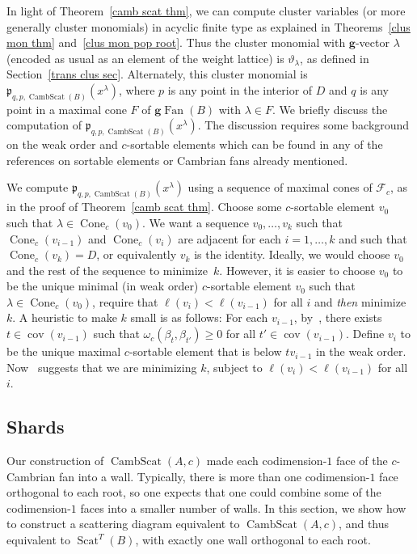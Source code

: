 \documentclass[ALCO,ThmDefs,Unicode,epreuves]{cedram}
\DeclareMathOperator{\cov}{cov}
\DeclareMathOperator{\Cone}{Cone}
\DeclareMathOperator{\Scat}{Scat}
\DeclareMathOperator{\Fan}{Fan}
\DeclareMathOperator{\CambScat}{CambScat}
\newcommand{\gFan}{\g\!\Fan}
\newcommand{\thet}{\vartheta}
\newcommand{\F}{{\mathcal F}}
\newcommand{\p}{{\mathfrak p}}
\newcommand{\g}{\mathbf{g}}
\begin{document}
\begin{rema}\label{comput}
In light of Theorem~\ref{camb scat thm}, we can compute cluster variables (or more generally cluster monomials) in acyclic finite type as explained in Theorems~\ref{clus mon thm} and~\ref{clus mon pop root}.
Thus the cluster monomial with $\g$-vector $\lambda$ (encoded as usual as an element of the weight lattice) is $\thet_\lambda$, as defined in Section~\ref{trans clus sec}.
Alternately, this cluster monomial is $\p_{q,p,\CambScat(B)}(x^\lambda)$, where $p$ is any point in the interior of $D$ and $q$ is any point in a maximal cone $F$ of $\gFan(B)$ with $\lambda\in F$.
We briefly discuss the computation of $\p_{q,p,\CambScat(B)}(x^\lambda)$.
The discussion requires some background on the weak order and $c$-sortable elements which can be found in any of the references on sortable elements or Cambrian fans already mentioned.

We compute $\p_{q,p,\CambScat(B)}(x^\lambda)$ using a sequence of maximal cones of $\F_c$, as in the proof of Theorem~\ref{camb scat thm}.
Choose some $c$-sortable element $v_0$ such that $\lambda\in\Cone_c(v_0)$.
We want a sequence $v_0,\ldots,v_k$ such that $\Cone_c(v_{i-1})$ and $\Cone_c(v_i)$ are adjacent for each $i=1,\ldots,k$ and such that $\Cone_c(v_k)=D$, or equivalently $v_k$ is the identity.
Ideally, we would choose $v_0$ and the rest of the sequence to minimize~$k$.
However, it is easier to choose $v_0$ to be the unique minimal (in weak order) $c$-sortable element $v_0$ such that $\lambda\in\Cone_c(v_0)$, require that $\ell(v_i)<\ell(v_{i-1})$ for all $i$ and \emph{then} minimize $k$.
A heuristic to make $k$ small is as follows:
For each $v_{i-1}$, by~\cite[Proposition~3.11]{typefree}, there exists $t\in\cov(v_{i-1})$ such that $\omega_c(\beta_t,\beta_{t'})\ge0$ for all $t'\in\cov(v_{i-1})$.
Define $v_i$ to be the unique maximal $c$-sortable element that is below $tv_{i-1}$ in the weak order.
Now~\cite[Proposition~3.11]{typefree} suggests that we are minimizing $k$, subject to $\ell(v_i)<\ell(v_{i-1})$ for all~$i$.
\end{rema}

\subsection{Shards}
Our construction of $\CambScat(A,c)$ made each codimension-$1$ face of the $c$-Cambrian fan into a wall.
Typically, there is more than one codimension-$1$ face orthogonal to each root, so one expects that one could combine some of the codimension-$1$ faces into a smaller number of walls.
In this section, we show how to construct a scattering diagram equivalent to $\CambScat(A,c)$, and thus equivalent to $\Scat^T(B)$, with exactly one wall orthogonal to each root.
\end{document}
